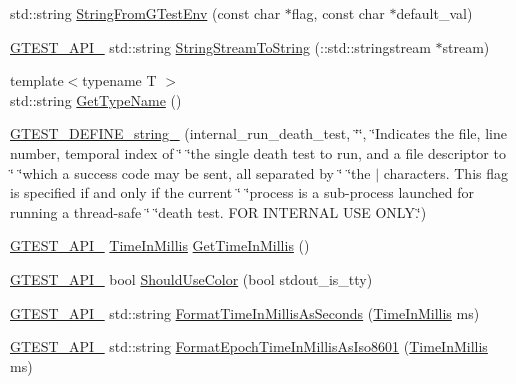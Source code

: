 \begin{DoxyCompactItemize}
\item 
std\+::string \hyperlink{namespacetesting_1_1internal_ac54dabc540bf79c2de91add679bfb93b}{String\+From\+G\+Test\+Env} (const char $\ast$flag, const char $\ast$default\+\_\+val)
\item 
\hyperlink{gtest-port_8h_aa73be6f0ba4a7456180a94904ce17790}{G\+T\+E\+S\+T\+\_\+\+A\+P\+I\+\_\+} std\+::string \hyperlink{namespacetesting_1_1internal_ac0a2b7f69fc829d80a39e925b6417e39}{String\+Stream\+To\+String} (\+::std\+::stringstream $\ast$stream)
\item 
{\footnotesize template$<$typename T $>$ }\\std\+::string \hyperlink{namespacetesting_1_1internal_a635606b4731f843c86ec8ca51cab83a1}{Get\+Type\+Name} ()
\item 
\hyperlink{namespacetesting_1_1internal_a20bfd9d47d8dd167ffc1c37a4c9ff73e}{G\+T\+E\+S\+T\+\_\+\+D\+E\+F\+I\+N\+E\+\_\+string\+\_\+} (internal\+\_\+run\+\_\+death\+\_\+test, \char`\"{}\char`\"{}, \char`\"{}Indicates the file, line number, temporal index of \char`\"{} \char`\"{}the single death test to run, and a file descriptor to \char`\"{} \char`\"{}which a success code may be sent, all separated by \char`\"{} \char`\"{}the \textquotesingle{}$\vert$\textquotesingle{} characters.  This flag is specified if and only if the current \char`\"{} \char`\"{}process is a sub-\/process launched for running a thread-\/safe \char`\"{} \char`\"{}death test.  F\+OR I\+N\+T\+E\+R\+N\+AL U\+SE O\+N\+L\+Y.\char`\"{})
\item 
\hyperlink{gtest-port_8h_aa73be6f0ba4a7456180a94904ce17790}{G\+T\+E\+S\+T\+\_\+\+A\+P\+I\+\_\+} \hyperlink{namespacetesting_1_1internal_a66a845df404b38fe85c5e14a069f255a}{Time\+In\+Millis} \hyperlink{namespacetesting_1_1internal_ae66b46943a429e6efb1db456d4cae90c}{Get\+Time\+In\+Millis} ()
\item 
\hyperlink{gtest-port_8h_aa73be6f0ba4a7456180a94904ce17790}{G\+T\+E\+S\+T\+\_\+\+A\+P\+I\+\_\+} bool \hyperlink{namespacetesting_1_1internal_ac1db1b4603967a6c4404f31cbbac31a6}{Should\+Use\+Color} (bool stdout\+\_\+is\+\_\+tty)
\item 
\hyperlink{gtest-port_8h_aa73be6f0ba4a7456180a94904ce17790}{G\+T\+E\+S\+T\+\_\+\+A\+P\+I\+\_\+} std\+::string \hyperlink{namespacetesting_1_1internal_a904485f27a54be8a5a92856e2d838797}{Format\+Time\+In\+Millis\+As\+Seconds} (\hyperlink{namespacetesting_1_1internal_a66a845df404b38fe85c5e14a069f255a}{Time\+In\+Millis} ms)
\item 
\hyperlink{gtest-port_8h_aa73be6f0ba4a7456180a94904ce17790}{G\+T\+E\+S\+T\+\_\+\+A\+P\+I\+\_\+} std\+::string \hyperlink{namespacetesting_1_1internal_a5ef227c4a610e7ff638b12dfb25b068e}{Format\+Epoch\+Time\+In\+Millis\+As\+Iso8601} (\hyperlink{namespacetesting_1_1internal_a66a845df404b38fe85c5e14a069f255a}{Time\+In\+Millis} ms)

\end{DoxyCompactItemize}
